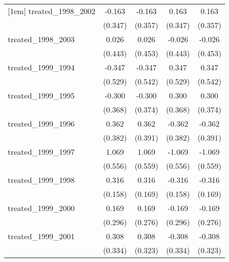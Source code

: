 {\begin{tabular}{l*{4}{c}}
[1em]
treated\_1998\_2002&      -0.163         &      -0.163         &       0.163         &       0.163         \\
            &     (0.347)         &     (0.357)         &     (0.347)         &     (0.357)         \\
[1em]
treated\_1998\_2003&       0.026         &       0.026         &      -0.026         &      -0.026         \\
            &     (0.443)         &     (0.453)         &     (0.443)         &     (0.453)         \\
[1em]
treated\_1999\_1994&      -0.347         &      -0.347         &       0.347         &       0.347         \\
            &     (0.529)         &     (0.542)         &     (0.529)         &     (0.542)         \\
[1em]
treated\_1999\_1995&      -0.300         &      -0.300         &       0.300         &       0.300         \\
            &     (0.368)         &     (0.374)         &     (0.368)         &     (0.374)         \\
[1em]
treated\_1999\_1996&       0.362         &       0.362         &      -0.362         &      -0.362         \\
            &     (0.382)         &     (0.391)         &     (0.382)         &     (0.391)         \\
[1em]
treated\_1999\_1997&       1.069         &       1.069         &      -1.069         &      -1.069         \\
            &     (0.556)         &     (0.559)         &     (0.556)         &     (0.559)         \\
[1em]
treated\_1999\_1998&       0.316\sym{*}  &       0.316         &      -0.316\sym{*}  &      -0.316         \\
            &     (0.158)         &     (0.169)         &     (0.158)         &     (0.169)         \\
[1em]
treated\_1999\_2000&       0.169         &       0.169         &      -0.169         &      -0.169         \\
            &     (0.296)         &     (0.276)         &     (0.296)         &     (0.276)         \\
[1em]
treated\_1999\_2001&       0.308         &       0.308         &      -0.308         &      -0.308         \\
            &     (0.334)         &     (0.323)         &     (0.334)         &     (0.323)         \\

\end{tabular}}
